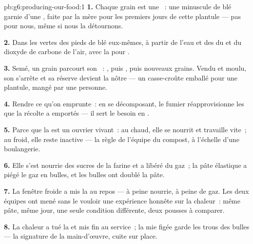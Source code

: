 \begin{solution}{pb:g6:producing-our-food:1}
\textbf{1.} Chaque grain est une ~: une minuscule  de
blé garnie d'une , faite par la mère pour les
premiers jours de cette plantule --- pas pour nous, même si nous la
détournons.

\textbf{2.} Dans les  vertes des pieds de blé eux-mêmes, à
partir de l'eau et des  du  et du dioxyde de carbone
de l'air, avec la  pour .

\textbf{3.} Semé, un grain parcourt son ~: ,
puis , puis nouveaux grains. Vendu et moulu, son 
s'arrête et sa réserve devient la nôtre --- un casse-croûte emballé
pour une plantule, mangé par une personne.

\textbf{4.} Rendre ce qu'on emprunte~: en se décomposant, le fumier
réapprovisionne les  que la récolte a emportés --- il
sert le besoin en .

\textbf{5.} Parce que la  est un ouvrier vivant~: au chaud,
elle se nourrit et travaille vite~; au froid, elle reste inactive
--- la règle de l'équipe du compost, à l'échelle d'une boulangerie.

\textbf{6.} Elle s'est nourrie des sucres de la farine et a libéré
du gaz~; la pâte élastique a piégé le gaz en bulles, et les bulles
ont doublé la pâte.

\textbf{7.} La fenêtre froide a mis la  au repos --- à peine
nourrie, à peine de gaz. Les deux équipes ont mené sans le vouloir
une expérience honnête sur la chaleur~: même pâte, même jour, une
seule condition différente, deux pousses à comparer.

\textbf{8.} La chaleur a tué la  et mis fin au service~; la
mie figée garde les trous des bulles --- la signature de la
main-d'œuvre, cuite sur place.


\end{solution}
